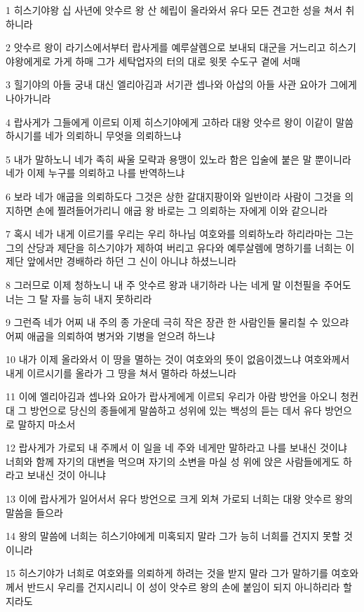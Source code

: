 \par 1 히스기야왕 십 사년에 앗수르 왕 산 헤립이 올라와서 유다 모든 견고한 성을 쳐서 취하니라
\par 2 앗수르 왕이 라기스에서부터 랍사게를 예루살렘으로 보내되 대군을 거느리고 히스기야왕에게로 가게 하매 그가 세탁업자의 터의 대로 윗못 수도구 곁에 서매
\par 3 힐기야의 아들 궁내 대신 엘리아김과 서기관 셉나와 아삽의 아들 사관 요아가 그에게 나아가니라
\par 4 랍사게가 그들에게 이르되 이제 히스기야에게 고하라 대왕 앗수르 왕이 이같이 말씀하시기를 네가 의뢰하니 무엇을 의뢰하느냐
\par 5 내가 말하노니 네가 족히 싸울 모략과 용맹이 있노라 함은 입술에 붙은 말 뿐이니라 네가 이제 누구를 의뢰하고 나를 반역하느냐
\par 6 보라 네가 애굽을 의뢰하도다 그것은 상한 갈대지팡이와 일반이라 사람이 그것을 의지하면 손에 찔려들어가리니 애굽 왕 바로는 그 의뢰하는 자에게 이와 같으니라
\par 7 혹시 네가 내게 이르기를 우리는 우리 하나님 여호와를 의뢰하노라 하리라마는 그는 그의 산당과 제단을 히스기야가 제하여 버리고 유다와 예루살렘에 명하기를 너희는 이 제단 앞에서만 경배하라 하던 그 신이 아니냐 하셨느니라
\par 8 그러므로 이제 청하노니 내 주 앗수르 왕과 내기하라 나는 네게 말 이천필을 주어도 너는 그 탈 자를 능히 내지 못하리라
\par 9 그런즉 네가 어찌 내 주의 종 가운데 극히 작은 장관 한 사람인들 물리칠 수 있으랴 어찌 애굽을 의뢰하여 병거와 기병을 얻으려 하느냐
\par 10 내가 이제 올라와서 이 땅을 멸하는 것이 여호와의 뜻이 없음이겠느냐 여호와께서 내게 이르시기를 올라가 그 땅을 쳐서 멸하라 하셨느니라
\par 11 이에 엘리아김과 셉나와 요아가 랍사게에게 이르되 우리가 아람 방언을 아오니 청컨대 그 방언으로 당신의 종들에게 말씀하고 성위에 있는 백성의 듣는 데서 유다 방언으로 말하지 마소서
\par 12 랍사게가 가로되 내 주께서 이 일을 네 주와 네게만 말하라고 나를 보내신 것이냐 너희와 함께 자기의 대변을 먹으며 자기의 소변을 마실 성 위에 앉은 사람들에게도 하라고 보내신 것이 아니냐
\par 13 이에 랍사게가 일어서서 유다 방언으로 크게 외쳐 가로되 너희는 대왕 앗수르 왕의 말씀을 들으라
\par 14 왕의 말씀에 너희는 히스기야에게 미혹되지 말라 그가 능히 너희를 건지지 못할 것이니라
\par 15 히스기야가 너희로 여호와를 의뢰하게 하려는 것을 받지 말라 그가 말하기를 여호와께서 반드시 우리를 건지시리니 이 성이 앗수르 왕의 손에 붙임이 되지 아니하리라 할지라도
